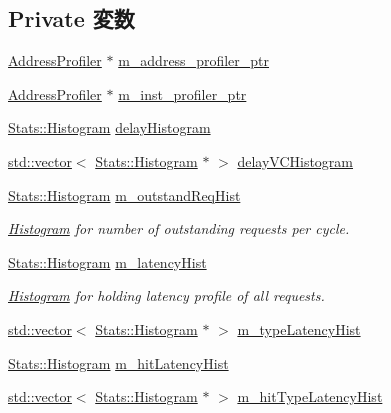 \subsection*{Private 変数}
\begin{DoxyCompactItemize}
\item 
\hyperlink{classAddressProfiler}{AddressProfiler} $\ast$ \hyperlink{classProfiler_a81f2770561a80c04d016aa328e512a2f}{m\_\-address\_\-profiler\_\-ptr}
\item 
\hyperlink{classAddressProfiler}{AddressProfiler} $\ast$ \hyperlink{classProfiler_a32ef2b97dac1a15df5891cb079a0f1b3}{m\_\-inst\_\-profiler\_\-ptr}
\item 
\hyperlink{classStats_1_1Histogram}{Stats::Histogram} \hyperlink{classProfiler_a9acbf121d28a34ab1b05049791522314}{delayHistogram}
\item 
\hyperlink{classstd_1_1vector}{std::vector}$<$ \hyperlink{classStats_1_1Histogram}{Stats::Histogram} $\ast$ $>$ \hyperlink{classProfiler_a0a78c2d2a792ab4ce77627c1465ec4e8}{delayVCHistogram}
\item 
\hyperlink{classStats_1_1Histogram}{Stats::Histogram} \hyperlink{classProfiler_a24e9160c0860bc93a5f57de63544fe65}{m\_\-outstandReqHist}
\begin{DoxyCompactList}\small\item\em \hyperlink{classHistogram}{Histogram} for number of outstanding requests per cycle. \item\end{DoxyCompactList}\item 
\hyperlink{classStats_1_1Histogram}{Stats::Histogram} \hyperlink{classProfiler_aeb3fc96d5f4638c5599ed141c6c6bda7}{m\_\-latencyHist}
\begin{DoxyCompactList}\small\item\em \hyperlink{classHistogram}{Histogram} for holding latency profile of all requests. \item\end{DoxyCompactList}\item 
\hyperlink{classstd_1_1vector}{std::vector}$<$ \hyperlink{classStats_1_1Histogram}{Stats::Histogram} $\ast$ $>$ \hyperlink{classProfiler_a21453ca0672126e1c0e204b7c60b3340}{m\_\-typeLatencyHist}
\item 
\hyperlink{classStats_1_1Histogram}{Stats::Histogram} \hyperlink{classProfiler_aa7b4f1cb2f6f69fac85f5fa0be12f95a}{m\_\-hitLatencyHist}
\item 
\hyperlink{classstd_1_1vector}{std::vector}$<$ \hyperlink{classStats_1_1Histogram}{Stats::Histogram} $\ast$ $>$ \hyperlink{classProfiler_aeecaf5411cd3b34435f621db03387b67}{m\_\-hitTypeLatencyHist}

\end{DoxyCompactItemize}
